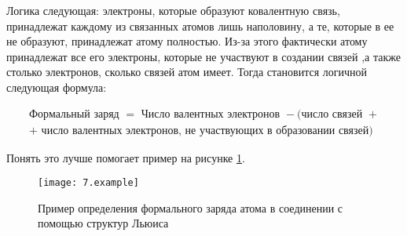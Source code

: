 Логика следующая: электроны, которые образуют ковалентную связь, принадлежат каждому из связанных атомов лишь наполовину, а те, которые в ее не образуют, принадлежат атому полностью. Из-за этого фактически атому принадлежат все его электроны, которые не участвуют в создании связей ,а также столько электронов, сколько связей атом имеет. Тогда становится логичной следующая формула:

\begin{align}
	\text{Формальный заряд } = \text{ Число валентных электронов } - (\text{число связей } + \\
	+ \text{ число валентных электронов, не участвующих в образовании связей})
\end{align}

Понять это лучше помогает пример на рисунке \ref{fig:7.example}.

\begin{figure}[H]
	\centering
	\texttt{[image: 7.example]}
	\caption{Пример определения формального заряда атома в соединении с помощью структур Льюиса}
	\label{fig:7.example}
\end{figure}






